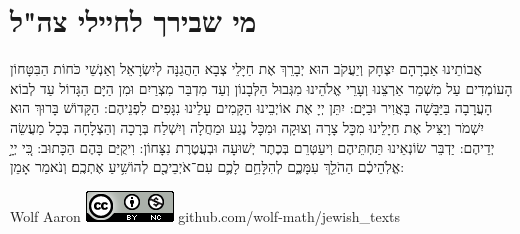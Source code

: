 \documentclass[a4paper, twoside, openany, parskip=half, 10pt]{article}
\begin{document}
\section*{מי שבירך לחיילי צה"ל}
\vspace{-.5\baselineskip}
\begin{multicols}{2}
אֲבוֹתֵינוּ אַבְרָהָם יִצְחָק וְיַעֲקֹב הוּא יְבָרֵךְ אֶת חַיָּלֵי צְבָא הַהֲגַנָּה לְיִשְׂרָאֵל וְאַנְשֵׁי כֹּחוֹת הַבִּטָּחוֹן הָעוֹמְדִים עַל מִשְׁמַר אַרְצֵנוּ וְעָרֵי אֱלֹהֵינוּ מִגְּבוּל הַלְּבָנוֹן וְעַד מִדְבַּר מִצְרַיִם וּמִן הַיָּם הַגָּדוֹל עַד לְבוֹא הָעֲרָבָה בַּיַּבָּשָׁה בָּאֲוִיר וּבַיָּם:
    יִתֵּן יְיָ אֶת אוֹיְבֵינוּ הַקָּמִים עָלֵינוּ נִגָּפִים לִפְנֵיהֶם: הַקָּדוֹשׁ בָּרוּךְ הוּא יִשְׁמֹר וְיַצִּיל אֶת חַיָלֵינוּ מִכׇּל צָרָה וְצוּקָה וּמִכׇּל נֶגַע וּמַחֲלָה וְיִשְׁלַח בְּרָכָה וְהַצְלָחָה בְּכָל מַעֲשֵׂה יְדֵיהֶם: יַדְבֵּר שׂוֹנְאֵינוּ תַּחְתֵּיהֶם וִיעַטְּרֵם בְּכֶתֶר יְשׁוּעָה וּבְעֲטֶרֶת נִצָּחוֹן: וִיקֻיַּם בָּהֶם הַכָּתוּב: כִּ֚י יְיָ֣ אֱלֹֽהֵיכֶ֔ם הַהֹלֵ֖ךְ עִמָּכֶ֑ם לְהִלָּחֵ֥ם לָכֶ֛ם עִם־אֹיְבֵיכֶ֖ם לְהוֹשִׁ֥יעַ אֶתְכֶֽם׃ 
 וְנֹאמַר אָמֵן:
\end{multicols}

\vfill

Wolf Aaron
\includegraphics[scale=.5]{images/cc.png}
github.com/wolf-math/jewish\_texts
\end{document}
